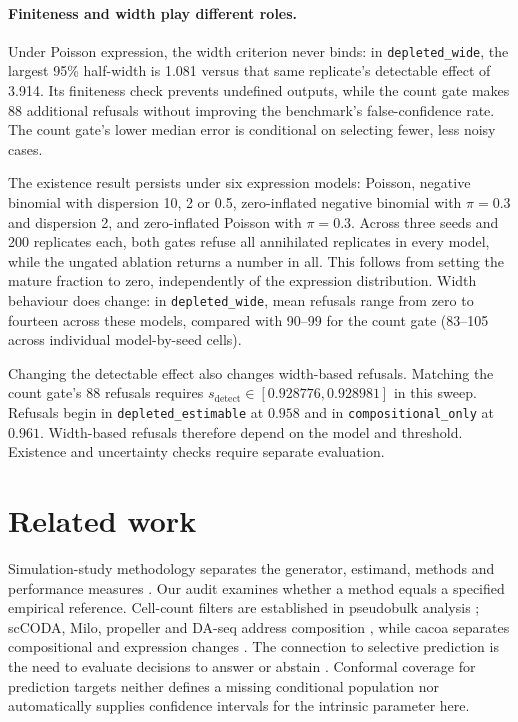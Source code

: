 \paragraph{Finiteness and width play different roles.}
Under Poisson expression, the width criterion never binds: in
\texttt{depleted\_wide}, the largest 95\% half-width is 1.081 versus that
same replicate's detectable effect of 3.914. Its finiteness check prevents undefined outputs,
while the count gate makes 88 additional refusals without improving the
benchmark's false-confidence rate. The count gate's lower median error is
conditional on selecting fewer, less noisy cases.

The existence result persists under six expression models: Poisson, negative
binomial with dispersion 10, 2 or 0.5, zero-inflated negative binomial with
$\pi=0.3$ and dispersion 2, and zero-inflated Poisson with $\pi=0.3$.
Across three seeds and 200 replicates each, both gates refuse all annihilated
replicates in every model, while the ungated ablation returns a number in all.
This follows from setting the mature fraction to zero, independently of the
expression distribution. Width behaviour does change: in
\texttt{depleted\_wide}, mean refusals range from zero to fourteen across
these models, compared with 90--99 for the count gate (83--105 across individual
model-by-seed cells).

Changing the detectable effect also changes width-based refusals. Matching the
count gate's 88 refusals requires
$s_{\mathrm{detect}}\in[0.928776,0.928981]$ in this sweep. Refusals begin in
\texttt{depleted\_estimable} at $0.958$ and in \texttt{compositional\_only} at
$0.961$. Width-based refusals therefore depend on the model and threshold. Existence
and uncertainty checks require separate evaluation.

\section{Related work}
\label{app:relatedwork}
Simulation-study methodology separates the generator, estimand, methods and
performance measures \citep{burton2006,morris2019}. Our audit examines whether
a method equals a specified empirical reference. Cell-count filters are
established in pseudobulk analysis \citep{crowell2020}; scCODA, Milo, propeller
and DA-seq address composition \citep{buettner2021,dann2022,phipson2022,zhao2021},
while cacoa separates compositional and expression changes \citep{petukhov2022}.
The connection to selective prediction is the need to evaluate decisions to
answer or abstain \citep{chow1970,elyaniv2010,geifman2017}. Conformal coverage
for prediction targets \citep{vovk2005,angelopoulos2023} neither defines a missing
conditional population nor automatically supplies confidence intervals for the
intrinsic parameter here.

